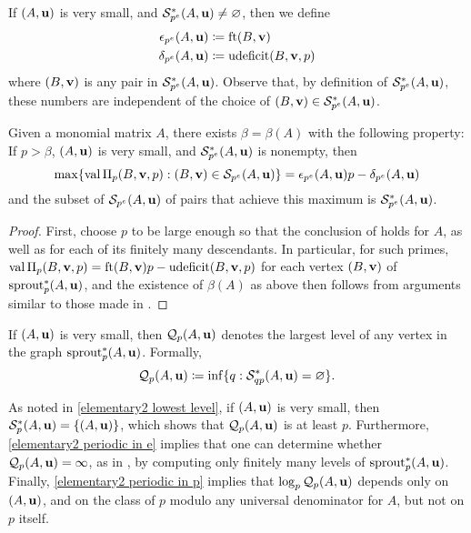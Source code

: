 \documentclass{amsart}
\begin{document}
\begin{definition}%
   \label{epsilon delta: D}
   If $(A,\mathbf{u})$ is very small, and $\mathcal{S}^{\ast}_{p^e}(A,\mathbf{u}) \neq \varnothing$, then we define
   \begin{align*}
     \epsilon_{p^e}(A,\mathbf{u}) & \coloneqq \operatorname{ft}(B, \mathbf{v}) \\
     \delta_{p^e}(A,\mathbf{u}) & \coloneqq \operatorname{udeficit}(B,\mathbf{v},p)
   \end{align*}
   where $(B,\mathbf{v})$ is any pair in $\mathcal{S}^{\ast}_{p^e}(A,\mathbf{u})$.
   Observe that, by definition of $\mathcal{S}^{\ast}_{p^e}(A,\mathbf{u})$, these numbers are independent of the choice of $(B,\mathbf{v}) \in \mathcal{S}^{\ast}_{p^e}(A,\mathbf{u})$.
\end{definition}

\begin{proposition}
   \label{p large graph: P}
   Given a monomial matrix $A$, there exists $\beta = \beta(A)$ with the following property\textup:
   If $p > \beta$, $(A,\mathbf{u})$ is very small, and $\mathcal{S}_{p^e}^{\ast}(A,\mathbf{u})$ is nonempty, then
   \[
      \max \{ \operatorname{val} \Pi_p(B,\mathbf{v},p) : (B,\mathbf{v}) \in \mathcal{S}_{p^e}(A,\mathbf{u}) \} = \epsilon_{p^e}(A,\mathbf{u}) p-\delta_{p^e}(A,\mathbf{u})
   \]
   and the subset of $\mathcal{S}_{p^e}(A,\mathbf{u})$ of pairs that achieve this maximum is $\mathcal{S}^{\ast}_{p^e}(A,\mathbf{u})$.
\end{proposition}

\begin{proof}
   First, choose $p$ to be large enough so that the conclusion of  holds for $A$, as well as for each of its finitely many descendants.
   In particular, for such primes, $\operatorname{val} \Pi_p(B,\mathbf{v},p) = \operatorname{ft}(B, \mathbf{v})p-\operatorname{udeficit}(B,\mathbf{v},p)$  for each vertex $(B,\mathbf{v})$ of $\operatorname{sprout}_p^{\ast}(A,\mathbf{u})$, and the existence of $\beta(A)$ as above then follows from arguments similar to those made in .
\end{proof}

\begin{definition}
   If $(A,\mathbf{u})$ is very small, then $\mathcal{Q}_p(A,\mathbf{u})$ denotes the largest level of any vertex in the graph $\operatorname{sprout}_p^{\ast}(A,\mathbf{u})$.
   Formally,
   \[
      \mathcal{Q}_p(A,\mathbf{u}) \coloneqq \inf \{ q :  \mathcal{S}^{\ast}_{qp}(A,\mathbf{u}) = \varnothing \}.
   \]
\end{definition}

As noted in \eqref{elementary2 lowest level}, if $(A,\mathbf{u})$ is very small, then $\mathcal{S}^{\ast}_p(A,\mathbf{u}) = \{ (A,\mathbf{u} )\}$, which shows that $\mathcal{Q}_p(A,\mathbf{u})$ is at least $p$.
Furthermore, \eqref{elementary2 periodic in e} implies that one can determine whether $\mathcal{Q}_p(A,\mathbf{u}) = \infty$, as in , by computing only finitely many levels of $\operatorname{sprout}_p^*(A,\mathbf{u})$.
Finally, \eqref{elementary2 periodic in p} implies that $\log_p \mathcal{Q}_p(A,\mathbf{u})$ depends only on $(A,\mathbf{u})$, and on the class of $p$ modulo any universal denominator for $A$, but not on $p$ itself.
\end{document}
